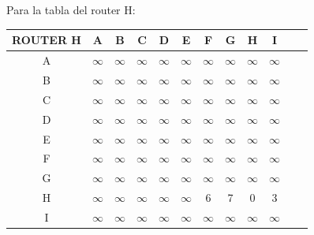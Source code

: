 \documentclass{article}
\begin{document}
\\\\
Para la tabla del router H:\\
\begin{tabular}{ | c | c | c | c | c | c | c | c | c | c | c | c |}
\hline                 
ROUTER H    & A      & B      & C      & D      & E      & F      & G      & H      & I      \\
\hline
        A   &$\infty$&$\infty$&$\infty$&$\infty$&$\infty$&$\infty$&$\infty$&$\infty$&$\infty$\\
\hline
        B   &$\infty$&$\infty$&$\infty$&$\infty$&$\infty$&$\infty$&$\infty$&$\infty$&$\infty$\\
\hline
        C   &$\infty$&$\infty$&$\infty$&$\infty$&$\infty$&$\infty$&$\infty$&$\infty$&$\infty$\\
\hline
        D   &$\infty$&$\infty$&$\infty$&$\infty$&$\infty$&$\infty$&$\infty$&$\infty$&$\infty$\\
\hline
        E   &$\infty$&$\infty$&$\infty$&$\infty$&$\infty$&$\infty$&$\infty$&$\infty$&$\infty$\\
\hline
        F   &$\infty$&$\infty$&$\infty$&$\infty$&$\infty$&$\infty$&$\infty$&$\infty$&$\infty$\\
\hline
        G   &$\infty$&$\infty$&$\infty$&$\infty$&$\infty$&$\infty$&$\infty$&$\infty$&$\infty$\\
\hline
        H   &$\infty$&$\infty$&$\infty$&$\infty$&$\infty$& 6      & 7      & 0      & 3      \\
\hline 
        I   &$\infty$&$\infty$&$\infty$&$\infty$&$\infty$&$\infty$&$\infty$&$\infty$&$\infty$\\
\hline
\end{tabular}
\\\\
\end{document}
